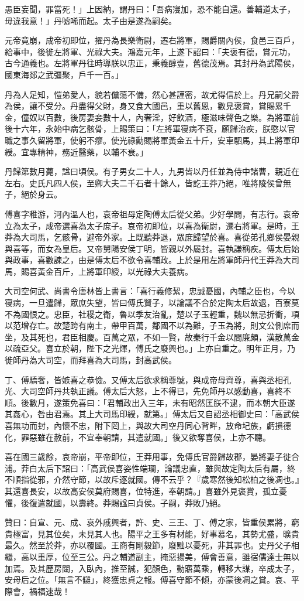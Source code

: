 \begin{pinyinscope}
愚臣妄聞，罪當死！」上因納，謂丹曰：「吾病寖加，恐不能自還。善輔道太子，毋違我意！」丹噓唏而起。太子由是遂為嗣矣。

元帝竟崩，成帝初即位，擢丹為長樂衛尉，遷右將軍，賜爵關內侯，食邑三百戶，給事中，後徙左將軍、光祿大夫。鴻嘉元年，上遂下詔曰：「夫褒有德，賞元功，古今通義也。左將軍丹往時導朕以忠正，秉義醇壹，舊德茂焉。其封丹為武陽侯，國東海郯之武彊聚，戶千一百。」

丹為人足知，愷弟愛人，貌若儻蕩不備，然心甚謹密，故尤得信於上。丹兄嗣父爵為侯，讓不受分。丹盡得父財，身又食大國邑，重以舊恩，數見褒賞，賞賜累千金，僮奴以百數，後房妻妾數十人，內奢淫，好飲酒，極滋味聲色之樂。為將軍前後十六年，永始中病乞骸骨，上賜策曰：「左將軍寑病不衰，願歸治疾，朕愍以官職之事久留將軍，使躬不瘳。使光祿勳賜將軍黃金五十斤，安車駟馬，其上將軍印綬。宜專精神，務近醫藥，以輔不衰。」

丹歸第數月薨，諡曰頃侯。有子男女二十人，九男皆以丹任並為侍中諸曹，親近在左右。史氏凡四人侯，至卿大夫二千石者十餘人，皆訖王莽乃絕，唯將陵侯曾無子，絕於身云。

傅喜字稚游，河內溫人也，哀帝祖母定陶傅太后從父弟。少好學問，有志行。哀帝立為太子，成帝選喜為太子庶子。哀帝初即位，以喜為衛尉，遷右將軍。是時，王莽為大司馬，乞骸骨，避帝外家。上既聽莽退，眾庶歸望於喜。喜從弟孔鄉侯晏親與喜等，而女為皇后。又帝舅陽安侯丁明，皆親以外屬封。喜執謙稱疾。傅太后始與政事，喜數諫之，由是傅太后不欲令喜輔政。上於是用左將軍師丹代王莽為大司馬，賜喜黃金百斤，上將軍印綬，以光祿大夫養病。

大司空何武、尚書令唐林皆上書言：「喜行義修絜，忠誠憂國，內輔之臣也，今以寑病，一旦遣歸，眾庶失望，皆曰傅氏賢子，以論議不合於定陶太后故退，百寮莫不為國恨之。忠臣，社稷之衛，魯以季友治亂，楚以子玉輕重，魏以無忌折衝，項以范增存亡。故楚跨有南土，帶甲百萬，鄰國不以為難，子玉為將，則文公側席而坐，及其死也，君臣相慶。百萬之眾，不如一賢，故秦行千金以間廉頗，漢散萬金以疏亞父。喜立於朝，陛下之光煇，傅氏之廢興也。」上亦自重之。明年正月，乃徙師丹為大司空，而拜喜為大司馬，封高武侯。

丁、傅驕奢，皆嫉喜之恭儉。又傅太后欲求稱尊號，與成帝母齊尊，喜與丞相孔光、大司空師丹共執正議。傅太后大怒，上不得已，先免師丹以感動喜，喜終不順。後數月，遂策免喜曰：「君輔政出入三年，未有昭然匡朕不逮，而本朝大臣遂其姦心，咎由君焉。其上大司馬印綬，就第。」傅太后又自詔丞相御史曰：「高武侯喜無功而封，內懷不忠，附下罔上，與故大司空丹同心背畔，放命圮族，虧損德化，罪惡雖在赦前，不宜奉朝請，其遣就國。」後又欲奪喜侯，上亦不聽。

喜在國三歲餘，哀帝崩，平帝即位，王莽用事，免傅氏官爵歸故郡，晏將妻子徙合浦。莽白太后下詔曰：「高武侯喜姿性端瓓，論議忠直，雖與故定陶太后有屬，終不順指從邪，介然守節，以故斥逐就國。傳不云乎？『歲寒然後知松柏之後凋也。』其還喜長安，以故高安侯莫府賜喜，位特進，奉朝請。」喜雖外見褒賞，孤立憂懼，後復遣就國，以壽終。莽賜諡曰貞侯。子嗣，莽敗乃絕。

贊曰：自宣、元、成、哀外戚興者，許、史、三王、丁、傅之家，皆重侯累將，窮貴極富，見其位矣，未見其人也。陽平之王多有材能，好事慕名，其勢尤盛，曠貴最久。然至於莽，亦以覆國。王商有剛毅節，廢黜以憂死，非其罪也。史丹父子相繼，高以重厚，位至三公。丹之輔道副主，掩惡揚美，傅會善意，雖宿儒達士無以加焉。及其歷房闥，入臥內，推至誠，犯顏色，動寤萬乘，轉移大謀，卒成太子，安母后之位。「無言不讎」，終獲忠貞之報。傅喜守節不傾，亦蒙後凋之賞。哀、平際會，禍福速哉！


\end{pinyinscope}